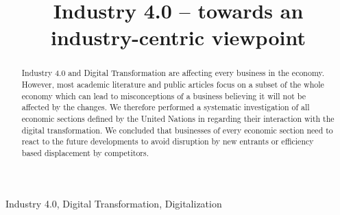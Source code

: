 


\title{Industry 4.0 – towards an industry-centric viewpoint}

\author{
	\and
}

\maketitle
\thispagestyle{plain}
\pagestyle{plain}


\begin{abstract}%
Industry 4.0 and Digital Transformation are affecting every business in the economy. However, most academic literature and public articles focus on a subset of the whole economy which can lead to misconceptions of a business believing it will not be affected by the changes. We therefore performed a systematic investigation of all economic sections defined by the United Nations in regarding their interaction with the digital transformation. We concluded that businesses of every economic section need to react to the future developments to avoid disruption by new entrants or efficiency based displacement by competitors. 
\end{abstract}

\begin{IEEEkeywords}
Industry 4.0, Digital Transformation, Digitalization
\end{IEEEkeywords}








\begingroup
\def\UrlBreaks{\do\/\do-}


\endgroup



